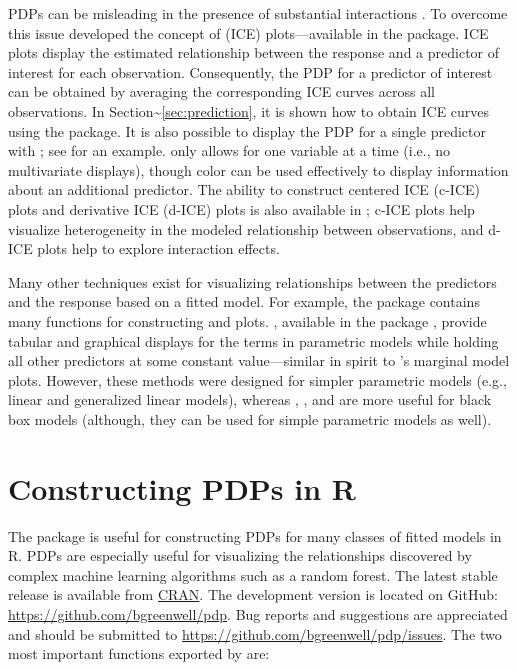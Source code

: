 PDPs can be misleading in the presence of substantial interactions
\citep{goldstein-peeking-2015}. To overcome this issue
\citeauthor*{goldstein-peeking-2015} developed the concept of
 (ICE) plots---available in the
 package. ICE plots display the estimated relationship
between the response and a predictor of interest for each observation.
Consequently, the PDP for a predictor of interest can be obtained by
averaging the corresponding ICE curves across all observations. In
Section\textasciitilde{}\ref{sec:prediction}, it is shown how to obtain
ICE curves using the  package. It is also possible to display
the PDP for a single predictor with ; see
 for an example.  only allows for
one variable at a time (i.e., no multivariate displays), though color
can be used effectively to display information about an additional
predictor. The ability to construct centered ICE (c-ICE) plots and
derivative ICE (d-ICE) plots is also available in ; c-ICE
plots help visualize heterogeneity in the modeled relationship between
observations, and d-ICE plots help to explore interaction effects.

Many other techniques exist for visualizing relationships between the
predictors and the response based on a fitted model. For example, the
 package \citep{fox-car-2011} contains many functions for
constructing  and  plots.
, available in the  package
\citep{fox-effects-2003}, provide tabular and graphical displays for the
terms in parametric models while holding all other predictors at some
constant value---similar in spirit to 's marginal model
plots. However, these methods were designed for simpler parametric
models (e.g., linear and generalized linear models), whereas
, , and  are more useful for black box
models (although, they can be used for simple parametric models as
well).

\section{Constructing PDPs in R}

The  package is useful for constructing PDPs for many classes
of fitted models in R. PDPs are especially useful for visualizing the
relationships discovered by complex machine learning algorithms such as
a random forest. The latest stable release is available from
\href{https://cran.r-project.org/package=pdp}{CRAN}. The development
version is located on GitHub: \url{https://github.com/bgreenwell/pdp}.
Bug reports and suggestions are appreciated and should be submitted to
\url{https://github.com/bgreenwell/pdp/issues}. The two most important
functions exported by  are:

